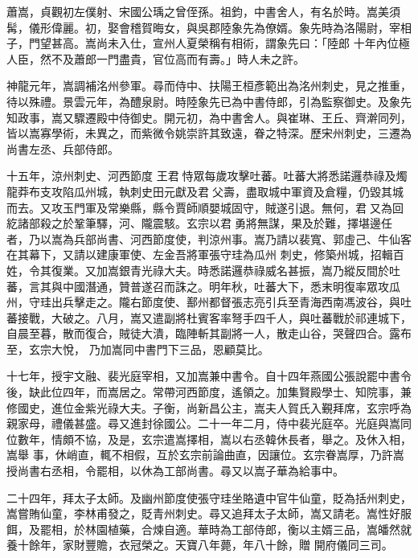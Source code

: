 \begin{pinyinscope}
 蕭嵩，貞觀初左僕射、宋國公瑀之曾侄孫。祖鈞，中書舍人，有名於時。嵩美須髯，儀形偉麗。初，娶會稽賀晦女，與吳郡陸象先為僚婿。象先時為洛陽尉，宰相子，門望甚高。嵩尚未入仕，宣州人夏榮稱有相術，謂象先曰：「陸郎
 十年內位極人臣，然不及蕭郎一門盡貴，官位高而有壽。」時人未之許。



 神龍元年，嵩調補洺州參軍。尋而侍中、扶陽王桓彥範出為洺州刺史，見之推重，待以殊禮。景雲元年，為醴泉尉。時陸象先已為中書侍郎，引為監察御史。及象先知政事，嵩又驟遷殿中侍御史。開元初，為中書舍人。與崔琳、王丘、齊澣同列，皆以嵩寡學術，未異之，而紫微令姚崇許其致遠，眷之特深。歷宋州刺史，三遷為尚書左丞、兵部侍郎。



 十五年，涼州刺史、河西節度
 王君恃眾每歲攻擊吐蕃。吐蕃大將悉諾邏恭祿及燭龍莽布支攻陷瓜州城，執刺史田元獻及君父壽，盡取城中軍資及倉糧，仍毀其城而去。又攻玉門軍及常樂縣，縣令賈師順嬰城固守，賊遂引退。無何，君又為回紇諸部殺之於鞏筆驛，河、隴震駭。玄宗以君勇將無謀，果及於難，擇堪邊任者，乃以嵩為兵部尚書、河西節度使，判涼州事。嵩乃請以裴寬、郭虛己、牛仙客在其幕下，又請以建康軍使、左金吾將軍張守珪為瓜州
 刺史，修築州城，招輯百姓，令其復業。又加嵩銀青光祿大夫。時悉諾邏恭祿威名甚振，嵩乃縱反間於吐蕃，言其與中國潛通，贊普遂召而誅之。明年秋，吐蕃大下，悉末明復率眾攻瓜州，守珪出兵擊走之。隴右節度使、鄯州都督張志亮引兵至青海西南馮波谷，與吐蕃接戰，大破之。八月，嵩又遣副將杜賓客率弩手四千人，與吐蕃戰於祁連城下，自晨至暮，散而復合，賊徒大潰，臨陣斬其副將一人，散走山谷，哭聲四合。露布至，玄宗大悅，
 乃加嵩同中書門下三品，恩顧莫比。



 十七年，授宇文融、裴光庭宰相，又加嵩兼中書令。自十四年燕國公張說罷中書令後，缺此位四年，而嵩居之。常帶河西節度，遙領之。加集賢殿學士、知院事，兼修國史，進位金紫光祿大夫。子衡，尚新昌公主，嵩夫人賀氏入覲拜席，玄宗呼為親家母，禮儀甚盛。尋又進封徐國公。二十一年二月，侍中裴光庭卒。光庭與嵩同位數年，情頗不協，及是，玄宗遣嵩擇相，嵩以右丞韓休長者，舉之。及休入相，嵩舉
 事，休峭直，輒不相假，互於玄宗前論曲直，因讓位。玄宗眷嵩厚，乃許嵩授尚書右丞相，令罷相，以休為工部尚書。尋又以嵩子華為給事中。



 二十四年，拜太子太師。及幽州節度使張守珪坐賂遺中官牛仙童，貶為括州刺史，嵩嘗賄仙童，李林甫發之，貶青州刺史。尋又追拜太子太師，嵩又請老。嵩性好服餌，及罷相，於林園植藥，合煉自適。華時為工部侍郎，衡以主婿三品，嵩皤然就養十餘年，家財豐贍，衣冠榮之。天寶八年薨，年八十餘，贈
 開府儀同三司。




\end{pinyinscope}
